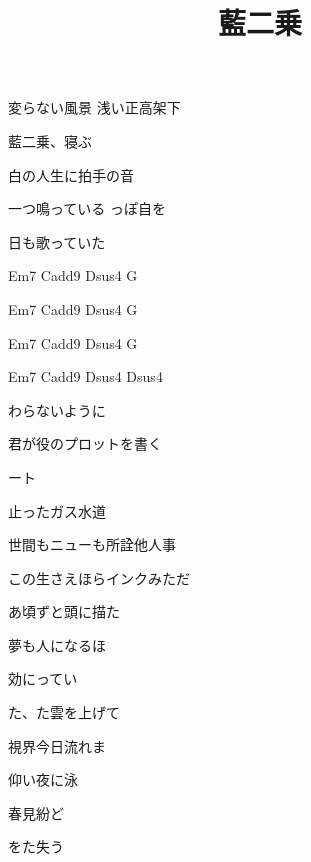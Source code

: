 \documentclass[uplatex, 11pt, dvipdfmx, twocolumn]{jsarticle}
\title{藍二乗}
\author{}
\date{}
\begin{document}
\maketitle

変らない風景 浅い正高架下

藍二乗、寝ぶ

白の人生に拍手の音

一つ鳴っている
っぽ自を

日も歌っていた

\vspace{2mm}

Em7 Cadd9  Dsus4 G

Em7 Cadd9 Dsus4 G

Em7 Cadd9 Dsus4 G

Em7 Cadd9 Dsus4 Dsus4

\vspace{2mm}

わらないように

君が役のプロットを書く

ート

止ったガス水道

世間もニューも所詮他人事

この生さえほらインクみただ

\vspace{2mm}

あ頃ずと頭に描た

夢も人になるほ

効にってい

\vspace{2mm}

た、た雲を上げて

視界今日流れま

仰い夜に泳

春見紛ど

をた失う
\end{document}
